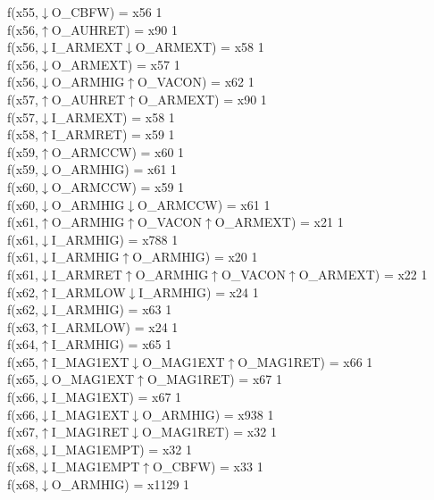 f(x55,$\downarrow$O\_CBFW) = x56 {1} \\
f(x56,$\uparrow$O\_AUHRET) = x90 {1} \\
f(x56,$\downarrow$I\_ARMEXT$\downarrow$O\_ARMEXT) = x58 {1} \\
f(x56,$\downarrow$O\_ARMEXT) = x57 {1} \\
f(x56,$\downarrow$O\_ARMHIG$\uparrow$O\_VACON) = x62 {1} \\
f(x57,$\uparrow$O\_AUHRET$\uparrow$O\_ARMEXT) = x90 {1} \\
f(x57,$\downarrow$I\_ARMEXT) = x58 {1} \\
f(x58,$\uparrow$I\_ARMRET) = x59 {1} \\
f(x59,$\uparrow$O\_ARMCCW) = x60 {1} \\
f(x59,$\downarrow$O\_ARMHIG) = x61 {1} \\
f(x60,$\downarrow$O\_ARMCCW) = x59 {1} \\
f(x60,$\downarrow$O\_ARMHIG$\downarrow$O\_ARMCCW) = x61 {1} \\
f(x61,$\uparrow$O\_ARMHIG$\uparrow$O\_VACON$\uparrow$O\_ARMEXT) = x21 {1} \\
f(x61,$\downarrow$I\_ARMHIG) = x788 {1} \\
f(x61,$\downarrow$I\_ARMHIG$\uparrow$O\_ARMHIG) = x20 {1} \\
f(x61,$\downarrow$I\_ARMRET$\uparrow$O\_ARMHIG$\uparrow$O\_VACON$\uparrow$O\_ARMEXT) = x22 {1} \\
f(x62,$\uparrow$I\_ARMLOW$\downarrow$I\_ARMHIG) = x24 {1} \\
f(x62,$\downarrow$I\_ARMHIG) = x63 {1} \\
f(x63,$\uparrow$I\_ARMLOW) = x24 {1} \\
f(x64,$\uparrow$I\_ARMHIG) = x65 {1} \\
f(x65,$\uparrow$I\_MAG1EXT$\downarrow$O\_MAG1EXT$\uparrow$O\_MAG1RET) = x66 {1} \\
f(x65,$\downarrow$O\_MAG1EXT$\uparrow$O\_MAG1RET) = x67 {1} \\
f(x66,$\downarrow$I\_MAG1EXT) = x67 {1} \\
f(x66,$\downarrow$I\_MAG1EXT$\downarrow$O\_ARMHIG) = x938 {1} \\
f(x67,$\uparrow$I\_MAG1RET$\downarrow$O\_MAG1RET) = x32 {1} \\
f(x68,$\downarrow$I\_MAG1EMPT) = x32 {1} \\
f(x68,$\downarrow$I\_MAG1EMPT$\uparrow$O\_CBFW) = x33 {1} \\
f(x68,$\downarrow$O\_ARMHIG) = x1129 {1} \\
